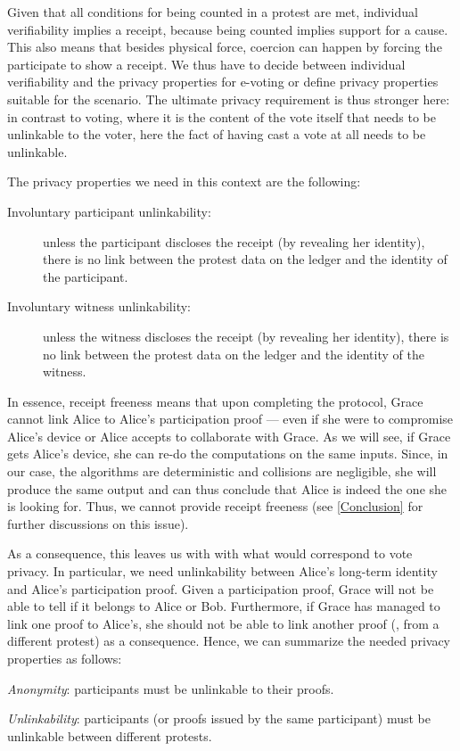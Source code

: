 Given that all conditions for being counted in a protest are met, individual verifiability implies a receipt, because being counted implies support for a cause. This also means that besides physical force, coercion can happen by forcing the participate to show a receipt. We thus have to decide between individual verifiability and the privacy properties for e-voting or define privacy properties suitable for the scenario. The ultimate privacy requirement is thus stronger here: in contrast to voting, where it is the content of the vote itself that needs to be unlinkable to the voter, here the fact of having cast a vote at all needs to be unlinkable.

The privacy properties we need in this context are the following:
\begin{description}
  \item[Involuntary participant unlinkability:] unless the participant 
    discloses the receipt (by revealing her identity), there is no link between 
    the protest data on the ledger and the identity of the participant.

  \item[Involuntary witness unlinkability:] unless the witness discloses the 
    receipt (by revealing her identity), there is no link between the protest 
    data on the ledger and the identity of the witness.
\end{description}
In essence, receipt freeness means that upon completing the protocol, Grace cannot link Alice to Alice's participation proof --- even if she were to compromise Alice's device or Alice accepts to collaborate with Grace.
As we will see, if Grace gets Alice's device, she can re-do the computations on the same inputs.
Since, in our case, the algorithms are deterministic and collisions are negligible, she will produce the same output and can thus conclude that Alice is indeed the one she is looking for.
Thus, we cannot provide receipt freeness (see \cref{Conclusion} for further discussions on this issue).

As a consequence, this leaves us with with what would correspond to vote privacy.
In particular, we need unlinkability between Alice's long-term identity and Alice's participation proof.
Given a participation proof, Grace will not be able to tell if it belongs to Alice or Bob.
Furthermore, if Grace has managed to link one proof to Alice's, she should not be able to link another proof (\eg, from a different protest) as a consequence.
Hence, we can summarize the needed privacy properties as follows:
\begin{requirements}[P]
\item\label{ProofUnlink} \emph{Anonymity}: participants must be unlinkable to their proofs.
\item\label{ProtestUnlink} \emph{Unlinkability}: participants (or proofs issued by the same participant) must be unlinkable between different protests.
\end{requirements}

